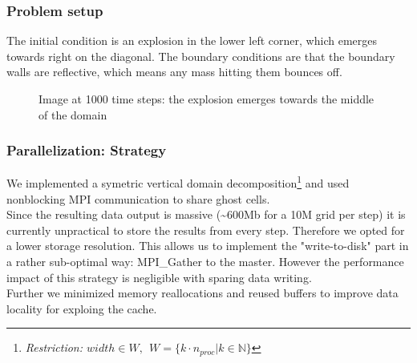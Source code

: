 \documentclass{beamer}
\begin{document}
\begin{frame}
\frametitle{Problem setup}
The initial condition is an explosion in the lower left corner, which emerges towards right on the diagonal. The boundary conditions are that the boundary walls are reflective, which means any mass hitting them bounces off. 

\begin{figure}

\caption{Image at 1000 time steps: the explosion emerges towards the middle of the domain}
\end{figure}

\end{frame}
%
%
%
\begin{frame}
\frametitle{Parallelization: Strategy}

We implemented a symetric vertical domain decomposition\footnote{ 
\emph{Restriction: $width\in W,~~W=\{k\cdot n_{proc}|k\in\mathbb{N}\}$ } } and used nonblocking MPI communication to share ghost cells.\\
\vspace{2mm}
Since the resulting data output is massive (\textasciitilde{}600Mb for a 10M grid per step) it is currently unpractical to store the results from every step. Therefore we opted for a lower storage resolution. This allows us to implement the "write-to-disk" part in a rather sub-optimal way: MPI\_Gather to the master. However the performance impact of this strategy is negligible with sparing data writing.\\
\vspace{2mm}
Further we minimized memory reallocations and reused buffers to improve data locality for exploing the cache. \\

\end{frame}
\end{document}
